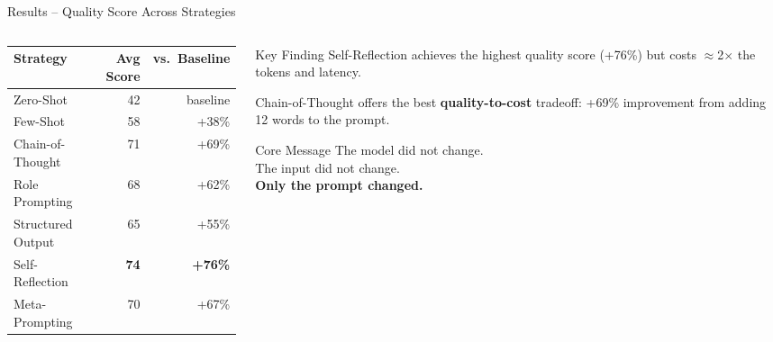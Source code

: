 \documentclass[aspectratio=169, 12pt]{beamer}
\begin{document}
\begin{frame}{Results -- Quality Score Across Strategies}
  \begin{columns}[T]
    \begin{column}{0.5\textwidth}
      \small
      \begin{tabular}{@{}lrr@{}}
        \toprule
        \textbf{Strategy}  & \textbf{Avg Score} & \textbf{vs.\ Baseline} \\
        \midrule
        Zero-Shot          & 42               & baseline \\
        Few-Shot           & 58               & +38\% \\
        Chain-of-Thought   & 71               & +69\% \\
        Role Prompting     & 68               & +62\% \\
        Structured Output  & 65               & +55\% \\
        Self-Reflection    & \textbf{74}      & \textbf{+76\%} \\
        Meta-Prompting     & 70               & +67\% \\
        \bottomrule
      \end{tabular}
    \end{column}
    \begin{column}{0.46\textwidth}
      \begin{exampleblock}{Key Finding}
        Self-Reflection achieves the highest quality score (+76\%) but costs
        $\approx$2$\times$ the tokens and latency.

        \medskip
        Chain-of-Thought offers the best \textbf{quality-to-cost} tradeoff:
        +69\% improvement from adding 12 words to the prompt.
      \end{exampleblock}
      \vspace{0.5em}
      \begin{alertblock}{Core Message}
        The model did not change.\\
        The input did not change.\\
        \textbf{Only the prompt changed.}
      \end{alertblock}
    \end{column}
  \end{columns}
\end{frame}
\end{document}

